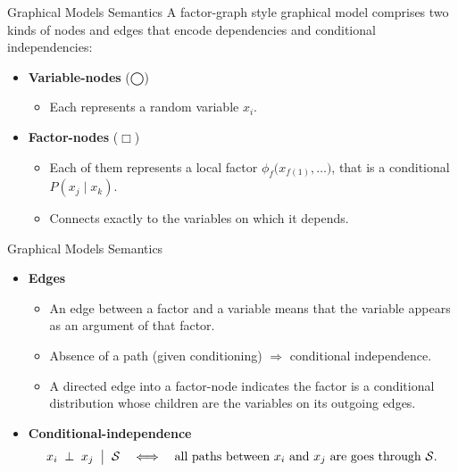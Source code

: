 \documentclass[aspectratio=1610, english]{beamer}
\begin{document}
\begin{frame}{Graphical Models Semantics}
  A factor-graph style graphical model comprises two kinds of nodes and edges that encode dependencies and conditional independencies:
  \begin{itemize}
    \item \textbf{Variable-nodes} (◯)  
      \begin{itemize}
        \item Each represents a random variable \(x_i\).
      \end{itemize}
    \item \textbf{Factor-nodes} ($\Box$)
      \begin{itemize}
        \item Each of them represents a local factor \(\phi_f\bigl(x_{f(1)},\dots\bigr)\), that is a conditional \(P(x_j\mid x_k)\).  
        \item Connects exactly to the variables on which it depends.  
      \end{itemize}
  \end{itemize}
\end{frame}

\begin{frame}{Graphical Models Semantics}
    \begin{itemize}
        \item \textbf{Edges}  
      \begin{itemize}
        \item An edge between a factor and a variable means that the variable appears as an argument of that factor.  
        \item Absence of a path (given conditioning) $\Rightarrow$ conditional independence.
        \item A directed edge into a factor-node indicates the factor is a conditional distribution whose children are the variables on its outgoing edges.
      \end{itemize}
    \item \textbf{Conditional-independence}  
      \[
        x_i \;\perp\; x_j 
        \;\bigm|\;
        \mathcal{S}
        \quad\Longleftrightarrow\quad
        \text{all paths between \(x_i\) and \(x_j\) are goes through }\mathcal{S}.
      \]
    \end{itemize}
\end{frame}
\end{document}
